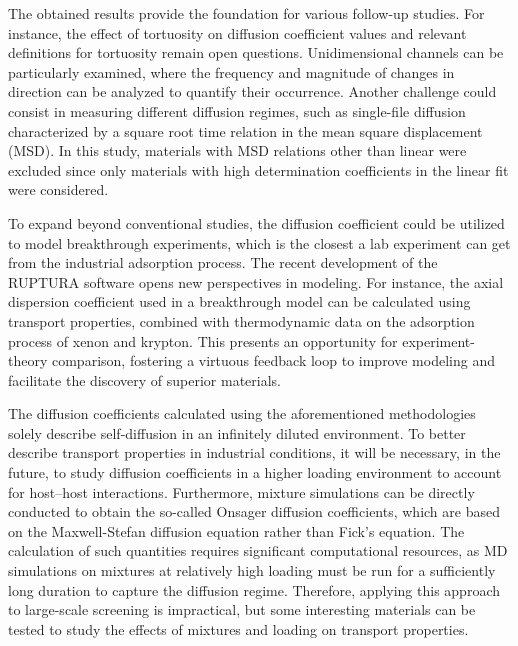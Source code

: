 \documentclass[main]{subfiles}
\begin{document}
The obtained results provide the foundation for various follow-up studies. For instance, the effect of tortuosity on diffusion coefficient values and relevant definitions for tortuosity remain open questions. Unidimensional channels can be particularly examined, where the frequency and magnitude of changes in direction can be analyzed to quantify their occurrence\autocite{Bullitt_2003}. Another challenge could consist in measuring different diffusion regimes, such as single-file diffusion characterized by a square root time relation in the mean square displacement (MSD)\autocite{Lin_2005}. In this study, materials with MSD relations other than linear were excluded since only materials with high determination coefficients in the linear fit were considered.

To expand beyond conventional studies, the diffusion coefficient could be utilized to model breakthrough experiments, which is the closest a lab experiment can get from the industrial adsorption process. The recent development of the RUPTURA software\autocite{Sharma_2023} opens new perspectives in modeling. For instance, the axial dispersion coefficient used in a breakthrough model can be calculated using transport properties, combined with thermodynamic data on the adsorption process of xenon and krypton. This presents an opportunity for experiment-theory comparison, fostering a virtuous feedback loop to improve modeling and facilitate the discovery of superior materials.

The diffusion coefficients calculated using the aforementioned methodologies solely describe self-diffusion in an infinitely diluted environment. To better describe transport properties in industrial conditions, it will be necessary, in the future, to study diffusion coefficients in a higher loading environment to account for host--host interactions. Furthermore, mixture simulations can be directly conducted to obtain the so-called Onsager diffusion coefficients, which are based on the Maxwell-Stefan diffusion equation rather than Fick's equation.\autocite{Krishna_2008} The calculation of such quantities requires significant computational resources, as MD simulations on mixtures at relatively high loading must be run for a sufficiently long duration to capture the diffusion regime. Therefore, applying this approach to large-scale screening is impractical, but some interesting materials can be tested to study the effects of mixtures and loading on transport properties.
\end{document}
